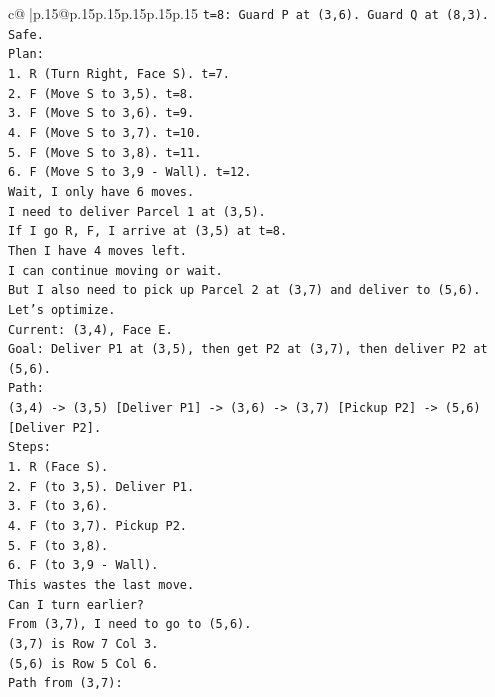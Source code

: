 \documentclass{article}
\begin{document}
{\begin{supertabular}{c@{$\;$}|p{.15\linewidth}@{}p{.15\linewidth}p{.15\linewidth}p{.15\linewidth}p{.15\linewidth}p{.15\linewidth}}
{{{\texttt{t=8: Guard P at (3,6). Guard Q at (8,3). Safe.} \\
\texttt{Plan:} \\
\texttt{1. R (Turn Right, Face S). t=7.} \\
\texttt{2. F (Move S to 3,5). t=8.} \\
\texttt{3. F (Move S to 3,6). t=9.} \\
\texttt{4. F (Move S to 3,7). t=10.} \\
\texttt{5. F (Move S to 3,8). t=11.} \\
\texttt{6. F (Move S to 3,9 {-} Wall). t=12.} \\
\texttt{Wait, I only have 6 moves.} \\
\texttt{I need to deliver Parcel 1 at (3,5).} \\
\texttt{If I go R, F, I arrive at (3,5) at t=8.} \\
\texttt{Then I have 4 moves left.} \\
\texttt{I can continue moving or wait.} \\
\texttt{But I also need to pick up Parcel 2 at (3,7) and deliver to (5,6).} \\
\texttt{Let's optimize.} \\
\texttt{Current: (3,4), Face E.} \\
\texttt{Goal: Deliver P1 at (3,5), then get P2 at (3,7), then deliver P2 at (5,6).} \\
\texttt{Path:} \\
\texttt{(3,4) {-}> (3,5) {[}Deliver P1{]} {-}> (3,6) {-}> (3,7) {[}Pickup P2{]} {-}> (5,6) {[}Deliver P2{]}.} \\
\texttt{Steps:} \\
\texttt{1. R (Face S).} \\
\texttt{2. F (to 3,5). Deliver P1.} \\
\texttt{3. F (to 3,6).} \\
\texttt{4. F (to 3,7). Pickup P2.} \\
\texttt{5. F (to 3,8).} \\
\texttt{6. F (to 3,9 {-} Wall).} \\
\texttt{This wastes the last move.} \\
\texttt{Can I turn earlier?} \\
\texttt{From (3,7), I need to go to (5,6).} \\
\texttt{(3,7) is Row 7 Col 3.} \\
\texttt{(5,6) is Row 5 Col 6.} \\
\texttt{Path from (3,7):} \\
}}}
\end{supertabular}}
\end{document}
